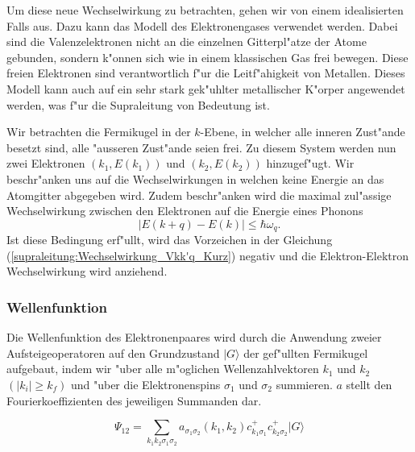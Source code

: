 \begin{refsection}
Um diese neue Wechselwirkung zu betrachten, gehen wir von einem idealisierten Falls aus.
Dazu kann das Modell des Elektronengases verwendet werden.
Dabei sind die Valenzelektronen nicht an die einzelnen Gitterpl"atze der Atome gebunden,
sondern k"onnen sich wie in einem klassischen Gas frei bewegen.
Diese freien Elektronen sind verantwortlich f"ur die Leitf"ahigkeit von Metallen.
Dieses Modell kann auch auf ein sehr stark gek"uhlter metallischer K"orper angewendet werden,
was f"ur die Supraleitung von Bedeutung ist.

Wir betrachten die Fermikugel in der $k$-Ebene, in welcher alle inneren Zust"ande besetzt sind,
alle "ausseren Zust"ande seien frei.
Zu diesem System werden nun zwei Elektronen $(k_1,E(k_1))$ und $(k_2,E(k_2))$ hinzugef"ugt.
Wir beschr"anken uns auf die Wechselwirkungen in welchen keine Energie an das Atomgitter abgegeben wird.
Zudem beschr"anken wird die maximal zul"assige Wechselwirkung zwischen den Elektronen auf die
Energie eines Phonons
\begin{equation}
|E(k+q)-E(k)|\le\hbar\omega_q .
\label{supraleitung:Phonon Energie}
\end{equation}
Ist diese Bedingung erf"ullt, wird das Vorzeichen in der Gleichung
(\ref{supraleitung:Wechselwirkung_Vkk'q_Kurz})
negativ und die Elektron-Elektron Wechselwirkung wird anziehend.

\subsubsection{Wellenfunktion}
Die Wellenfunktion des Elektronenpaares wird durch die Anwendung zweier Aufsteigeoperatoren
auf den Grundzustand $|G\rangle$ der gef"ullten Fermikugel aufgebaut, indem wir "uber
alle m"oglichen Wellenzahlvektoren $k_1$ und $k_2$ $(|k_i| \ge k_f)$ und "uber
die Elektronenspins $\sigma_1$ und $\sigma_2$ summieren.
$a$ stellt den Fourierkoeffizienten des jeweiligen Summanden dar.

\begin{equation}
\Psi_{12}=\sum \limits_{k_1k_2\sigma_1\sigma_2} a_{\sigma_1\sigma_2}
(k_1,k_2)c^+_{k_1\sigma_1}c^+_{k_2\sigma_2}|G\rangle
\label{supraleitung:WellenfktAllg}
\end{equation}


\end{refsection}
